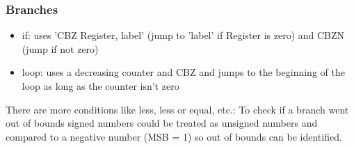 \documentclass[a4paper]{scrartcl}
\begin{document}
            \subsubsection*{Branches}
            \begin{itemize}
                \item if: uses 'CBZ Register, label' (jump to 'label' if Register is zero) and CBZN (jump if not zero)
                \item loop: uses a decreasing counter and CBZ and jumps to the beginning of the loop as long as the counter isn't zero
            \end{itemize}
            There are more conditions like less, less or equal, etc.: 
            To check if a branch went out of bounds signed numbers could be treated as unsigned numbers and compared to a negative number (MSB = 1) so out of bounds can be identified. 
\end{document}
